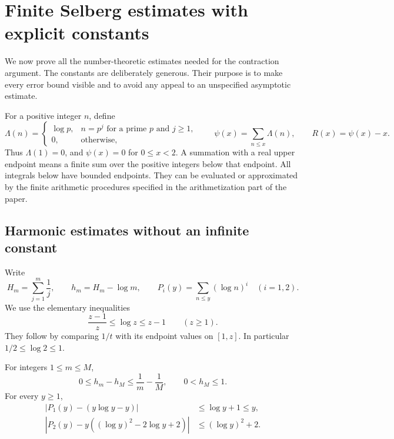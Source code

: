 \section{Finite Selberg estimates with explicit constants}
\label{sb:section}

We now prove all the number-theoretic estimates needed for the contraction
argument.  The constants are deliberately generous.  Their purpose is to
make every error bound visible and to avoid any appeal to an unspecified
asymptotic estimate.

For a positive integer $n$, define
\[
 \Lambda(n)=
 \begin{cases}
  \log p,&n=p^j\text{ for a prime }p\text{ and }j\ge1,\\
  0,&\text{otherwise},
 \end{cases}
 \qquad
 \psi(x)=\sum_{n\le x}\Lambda(n),
 \qquad R(x)=\psi(x)-x.
\]
Thus $\Lambda(1)=0$, and $\psi(x)=0$ for $0\le x<2$.  A summation
with a real upper endpoint means a finite sum over the positive integers
below that endpoint.  All integrals below have bounded endpoints.  They
can be evaluated or approximated by the finite arithmetic procedures
specified in the arithmetization part of the paper.

\subsection{Harmonic estimates without an infinite constant}
\label{sb:harmonic}

Write
\[
 H_m=\sum_{j=1}^m\frac1j,\qquad
 h_m=H_m-\log m,\qquad
 P_i(y)=\sum_{n\le y}(\log n)^i\quad(i=1,2).
\]
We use the elementary inequalities
\begin{equation}
 \frac{z-1}{z}\le\log z\le z-1\qquad(z\ge1).
 \label{sb:log-basic}
\end{equation}
They follow by comparing $1/t$ with its endpoint values on $[1,z]$.
In particular $1/2\le\log2\le1$.

\begin{lemma}
\label{sb:harmonic-finite}
For integers $1\le m\le M$,
\[
 0\le h_m-h_M\le\frac1m-\frac1M,
 \qquad 0<h_M\le1.
\]
For every $y\ge1$,
\begin{align}
 |P_1(y)-(y\log y-y)|&\le\log y+1\le y,
 \label{sb:log-sum}\\
 |P_2(y)-y((\log y)^2-2\log y+2)|
   &\le(\log y)^2+2.
 \label{sb:log-square-sum}
\end{align}
\end{lemma}

